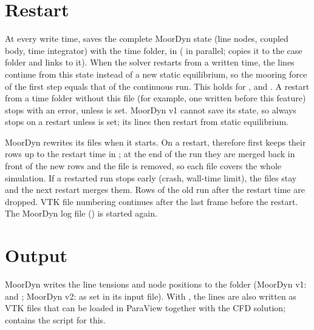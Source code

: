 \section{Restart}
At every write time,  saves the complete MoorDyn state (line nodes, coupled body,
time integrator) with the time folder, in
 ( in parallel;
 copies it to the case folder and  links to it). When the
solver restarts from a written time, the lines continue from this state instead of a new static
equilibrium, so the mooring force of the first step equals that of the continuous run. This holds
for ,  and . A restart from
a time folder without this file (for example, one written before this feature) stops with an error,
unless  is set. MoorDyn v1 cannot save its state, so 
always stops on a restart unless  is set; its lines then restart from
static equilibrium.

MoorDyn rewrites its  files when it starts. On a restart,  therefore
first keeps their rows up to the restart time in ; at the end of the run
they are merged back in front of the new rows and the  file is removed, so each
 file covers the whole simulation. If a restarted run stops early (crash, wall-time
limit), the  files stay and the next restart merges them. Rows of the old run after the
restart time are dropped. VTK file numbering continues after the last frame before the restart.
The MoorDyn log file () is started again.

\section{Output}
MoorDyn writes the line tensions and node positions to the  folder (MoorDyn v1:
 and ; MoorDyn v2: as set in its input file). With
, the lines are also written as VTK files that can be loaded in
ParaView together with the CFD solution;  contains the script
 for this.
